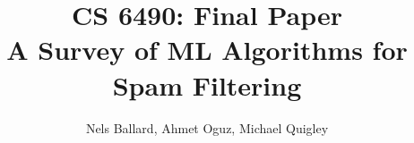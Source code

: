 \documentclass[letterpaper,twocolumn,10pt]{article}
\title{CS 6490: Final Paper \\
A Survey of ML Algorithms for Spam Filtering}
\author{Nels Ballard, Ahmet Oguz, Michael Quigley}
\affil{School of Computing, University of Utah}
\begin{document}
\maketitle








{
  \small 
  
  
}
\end{document}
